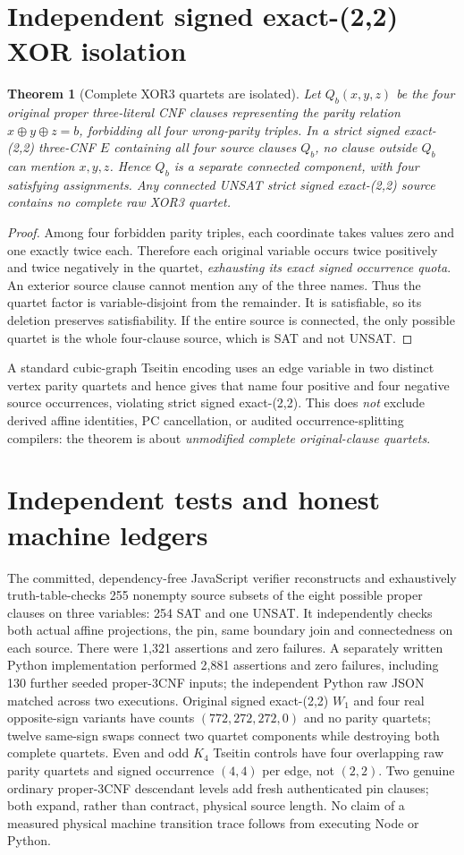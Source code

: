 \documentclass[11pt]{article}
\newtheorem{theorem}{Theorem}
\begin{document}
\section{Independent signed exact-(2,2) XOR isolation}
\begin{theorem}[Complete XOR3 quartets are isolated]
\label{th:xor}
Let $Q_b(x,y,z)$ be the four original proper
three-literal CNF clauses representing the parity
relation $x\oplus y\oplus z=b$, forbidding all
four wrong-parity triples. In a strict signed
exact-(2,2) three-CNF $E$ containing all four
source clauses $Q_b$, no clause outside
$Q_b$ can mention $x,y,z$. Hence $Q_b$ is
a separate connected component, with four
satisfying assignments. Any connected UNSAT
strict signed exact-(2,2) source contains no
complete raw XOR3 quartet.
\end{theorem}
\begin{proof}
Among four forbidden parity triples, each
coordinate takes values zero and one exactly
twice each. Therefore each original variable
occurs twice positively and twice negatively
in the quartet, \emph{exhausting its exact
signed occurrence quota}. An exterior source
clause cannot mention any of the three names.
Thus the quartet factor is variable-disjoint
from the remainder. It is satisfiable,
so its deletion preserves satisfiability.
If the entire source is connected, the only
possible quartet is the whole four-clause
source, which is SAT and not UNSAT.
\end{proof}
A standard cubic-graph Tseitin encoding uses
an edge variable in two distinct vertex parity
quartets and hence gives that name four positive
and four negative source occurrences, violating
strict signed exact-(2,2). This does \emph{not}
exclude derived affine identities, PC cancellation,
or audited occurrence-splitting compilers:
the theorem is about \emph{unmodified complete
original-clause quartets}.

\section{Independent tests and honest machine ledgers}
The committed, dependency-free JavaScript verifier
reconstructs and exhaustively truth-table-checks
255 nonempty source subsets of the eight
possible proper clauses on three variables:
254 SAT and one UNSAT. It independently checks
both actual affine projections, the pin, same
boundary join and connectedness on each source.
There were 1,321 assertions and zero failures.
A separately written Python implementation
performed 2,881 assertions and zero failures,
including 130 further seeded proper-3CNF inputs;
the independent Python raw JSON matched across
two executions. Original signed exact-(2,2)
$W_1$ and four real opposite-sign variants
have counts $(772,272,272,0)$ and no parity
quartets; twelve same-sign swaps connect
two quartet components while destroying
both complete quartets. Even and odd
$K_4$ Tseitin controls have four overlapping
raw parity quartets and signed occurrence
$(4,4)$ per edge, not $(2,2)$.
Two genuine ordinary proper-3CNF descendant
levels add fresh authenticated pin clauses;
both expand, rather than contract, physical
source length. No claim of a measured physical
machine transition trace follows from
executing Node or Python.
\end{document}
